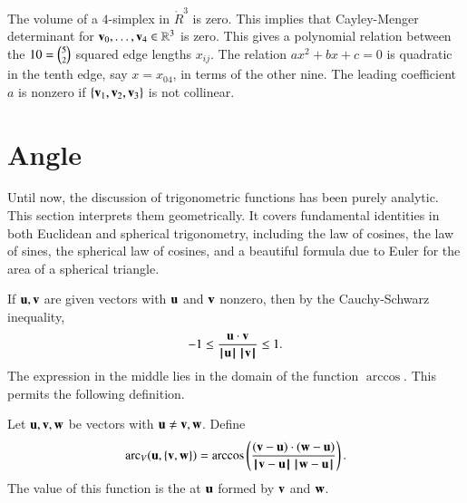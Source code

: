 \begin{remark}[]\label{rem:CM5}
  The volume of a $4$-simplex in $\ring{R}^3$ is zero.  This implies
  that Cayley-Menger determinant for ${\mathbf v}_0,\ldots,{\mathbf v}_4\in\mathbb{R}^3$
  is zero.%
  This gives a polynomial relation between the $10 = \tbinom{5}{2}$
  squared edge lengths $x_{ij}$.  The relation $a x^2 + b x + c=0$ is
  quadratic in the tenth edge, say $x=x_{04}$, in terms of the other
  nine. The leading coefficient $a$ is nonzero if $\{{\mathbf v}_1,{\mathbf v}_2,{\mathbf v}_3\}$
  is not collinear.%
\end{remark}

\section{Angle}\label{sec:angle}

Until now, the discussion of trigonometric functions has been purely
analytic.  This section interprets them geometrically.  It covers
fundamental identities in both Euclidean and spherical trigonometry,
including the law of cosines, the law of sines, the spherical law of
cosines, and a beautiful formula due to Euler for the area of a
spherical triangle.

If ${\mathbf u},{\mathbf v}$ are given vectors with ${\mathbf u}$ and ${\mathbf v}$ nonzero, then by the
Cauchy-Schwarz inequality,
\begin{displaymath}-1 \le \frac{{\mathbf u}\cdot {\mathbf v}}{{{\hskip0.1em|\hskip-0.15em|\hskip0.1em}{\mathbf u}{\hskip0.1em|\hskip-0.15em|\hskip0.1em}}\,{{\hskip0.1em|\hskip-0.15em|\hskip0.1em}{\mathbf v}{\hskip0.1em|\hskip-0.15em|\hskip0.1em}}}
  \le 1.\end{displaymath} The expression in the middle lies in the
domain of the function $\arccos$. This permits the following
definition.  %
%
%

\begin{definition}\label{def:angle}
Let ${\mathbf u},{\mathbf v},{\mathbf w}$ be vectors with ${\mathbf u}\ne {\mathbf v},{\mathbf w}$.
Define 
\begin{displaymath}
  \arc_V(\u,\{\v,\w\}) = \arccos\left(\frac{(\v-\u)\cdot 
(\w-\u)}{\norm{\v}{\u}\,\norm{\w}{\u}}\right).
\end{displaymath}
The value of this function is the  at ${\mathbf u}$ formed by
${\mathbf v}$ and ${\mathbf w}$.  %
%
%
%
%
\end{definition}

